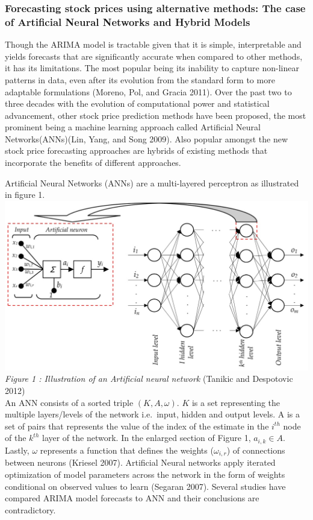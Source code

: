 \documentclass[12pt,a4paper]{article}
\numberwithin{equation}{section}
\numberwithin{figure}{section}
\numberwithin{table}{section}
\begin{document}
\subsubsection{Forecasting stock prices using alternative methods: The
case of Artificial Neural Networks and Hybrid
Models}\label{forecasting-stock-prices-using-alternative-methods-the-case-of-artificial-neural-networks-and-hybrid-models}

Though the ARIMA model is tractable given that it is simple,
interpretable and yields forecasts that are significantly accurate when
compared to other methods, it has its limitations. The most popular
being its inability to capture non-linear patterns in data, even after
its evolution from the standard form to more adaptable formulations
(Moreno, Pol, and Gracia 2011). Over the past two to three decades with
the evolution of computational power and statistical advancement, other
stock price prediction methods have been proposed, the most prominent
being a machine learning approach called Artificial Neural
Networks(ANNs)(Lin, Yang, and Song 2009). Also popular amongst the new
stock price forecasting approaches are hybrids of existing methods that
incorporate the benefits of different approaches.

Artificial Neural Networks (ANNs) are a multi-layered perceptron as
illustrated in figure 1.\\
\includegraphics{ANN.png}\\
\emph{Figure 1 : Illustration of an Artificial neural network} (Tanikic
and Despotovic 2012)\\
An ANN consists of a sorted triple \((K, A, \omega)\). \(K\) is a set
representing the multiple layers/levels of the network i.e.~input,
hidden and output levels. A is a set of pairs that represents the value
of the index of the estimate in the \(i^{th}\) node of the \(k^{th}\)
layer of the network. In the enlarged section of Figure 1,
\(a_{i,k} \in A\). Lastly, \(\omega\) represents a function that defines
the weights (\(\omega_{i,r}\)) of connections between neurons (Kriesel
2007). Artificial Neural networks apply iterated optimization of model
parameters across the network in the form of weights conditional on
observed values to learn (Segaran 2007). Several studies have compared
ARIMA model forecasts to ANN and their conclusions are contradictory.
\end{document}
